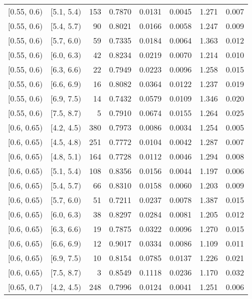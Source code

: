 \begin{longtable}{| l | l | r | r | r | r | r | r |}
        $[$0.55, 0.6$)$ & $[$5.1, 5.4$)$ & 153 & 0.7870 & 0.0131 & 0.0045 & 1.271 & 0.007 \\
        $[$0.55, 0.6$)$ & $[$5.4, 5.7$)$ & 90 & 0.8021 & 0.0166 & 0.0058 & 1.247 & 0.009 \\
        $[$0.55, 0.6$)$ & $[$5.7, 6.0$)$ & 59 & 0.7335 & 0.0184 & 0.0064 & 1.363 & 0.012 \\
        $[$0.55, 0.6$)$ & $[$6.0, 6.3$)$ & 42 & 0.8234 & 0.0219 & 0.0070 & 1.214 & 0.010 \\
        $[$0.55, 0.6$)$ & $[$6.3, 6.6$)$ & 22 & 0.7949 & 0.0223 & 0.0096 & 1.258 & 0.015 \\
        $[$0.55, 0.6$)$ & $[$6.6, 6.9$)$ & 16 & 0.8082 & 0.0364 & 0.0122 & 1.237 & 0.019 \\
        $[$0.55, 0.6$)$ & $[$6.9, 7.5$)$ & 14 & 0.7432 & 0.0579 & 0.0109 & 1.346 & 0.020 \\
        $[$0.55, 0.6$)$ & $[$7.5, 8.7$)$ & 5 & 0.7910 & 0.0674 & 0.0155 & 1.264 & 0.025 \\
        $[$0.6, 0.65$)$ & $[$4.2, 4.5$)$ & 380 & 0.7973 & 0.0086 & 0.0034 & 1.254 & 0.005 \\
        $[$0.6, 0.65$)$ & $[$4.5, 4.8$)$ & 251 & 0.7772 & 0.0104 & 0.0042 & 1.287 & 0.007 \\
        $[$0.6, 0.65$)$ & $[$4.8, 5.1$)$ & 164 & 0.7728 & 0.0112 & 0.0046 & 1.294 & 0.008 \\
        $[$0.6, 0.65$)$ & $[$5.1, 5.4$)$ & 108 & 0.8356 & 0.0156 & 0.0044 & 1.197 & 0.006 \\
        $[$0.6, 0.65$)$ & $[$5.4, 5.7$)$ & 66 & 0.8310 & 0.0158 & 0.0060 & 1.203 & 0.009 \\
        $[$0.6, 0.65$)$ & $[$5.7, 6.0$)$ & 51 & 0.7211 & 0.0237 & 0.0078 & 1.387 & 0.015 \\
        $[$0.6, 0.65$)$ & $[$6.0, 6.3$)$ & 38 & 0.8297 & 0.0284 & 0.0081 & 1.205 & 0.012 \\
        $[$0.6, 0.65$)$ & $[$6.3, 6.6$)$ & 19 & 0.7875 & 0.0322 & 0.0096 & 1.270 & 0.015 \\
        $[$0.6, 0.65$)$ & $[$6.6, 6.9$)$ & 12 & 0.9017 & 0.0334 & 0.0086 & 1.109 & 0.011 \\
        $[$0.6, 0.65$)$ & $[$6.9, 7.5$)$ & 10 & 0.8154 & 0.0785 & 0.0137 & 1.226 & 0.021 \\
        $[$0.6, 0.65$)$ & $[$7.5, 8.7$)$ & 3 & 0.8549 & 0.1118 & 0.0236 & 1.170 & 0.032 \\
        $[$0.65, 0.7$)$ & $[$4.2, 4.5$)$ & 248 & 0.7996 & 0.0124 & 0.0041 & 1.251 & 0.006 \\

\end{longtable}
